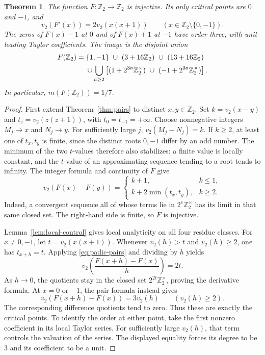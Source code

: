 \documentclass[11pt]{article}
\newtheorem{theorem}{Theorem}
\theoremstyle{remark}\newtheorem{remark}[theorem]{Remark}
\newcommand{\Ztwo}{\mathbb Z_2}\newcommand{\Qtwo}{\mathbb Q_2}
\begin{document}
\begin{theorem}\label{thm:image}
The function $F:\Ztwo\longrightarrow\Ztwo$ is injective. Its only
critical points are $0$ and $-1$, and
\[
 v_2(F'(x))=2v_2(x(x+1))\qquad(x\in\Ztwo\setminus\{0,-1\}).
\]
The zeros of $F(x)-1$ at $0$ and of $F(x)+1$ at $-1$ have order
three, with unit leading Taylor coefficients. The image is the
disjoint union
\begin{align}
 F(\Ztwo)={}&\{1,-1\}\ \cup\ (3+16\Ztwo)\ \cup\ (13+16\Ztwo)
 \notag\\
 &{}\cup\bigcup_{a\ge2}
 \left[(1+2^{3a}\Ztwo^\times)\ \cup\
       (-1+2^{3a}\Ztwo^\times)\right].\label{eq:exact-image}
\end{align}
In particular, $m(F(\Ztwo))=1/7$.
\end{theorem}
\begin{proof}
First extend Theorem~\ref{thm:pairs} to distinct $x,y\in\Ztwo$.
Set $k=v_2(x-y)$ and $t_z=v_2(z(z+1))$, with
$t_0=t_{-1}=+\infty$. Choose nonnegative integers $M_j\to x$ and
$N_j\to y$. For sufficiently large $j$, $v_2(M_j-N_j)=k$. If
$k\ge2$, at least one of $t_x,t_y$ is finite, since the distinct
roots $0,-1$ differ by an odd number. The minimum of the two
$t$-values therefore also stabilizes: a finite value is locally
constant, and the $t$-value of an approximating sequence tending to
a root tends to infinity. The integer formula and continuity of $F$
give
\begin{equation}\label{eq:padic-pairs}
 v_2(F(x)-F(y))=
 \begin{cases}
 k+1,& k\le1,\\
 k+2\min(t_x,t_y),& k\ge2.
 \end{cases}
\end{equation}
Indeed, a convergent sequence all of whose terms lie in
$2^e\Ztwo^\times$ has its limit in that same closed set. The
right-hand side is finite, so $F$ is injective.

Lemma~\ref{lem:local-control} gives local analyticity on all four
residue classes. For $x\ne0,-1$, let $t=v_2(x(x+1))$. Whenever
$v_2(h)>t$ and $v_2(h)\ge2$, one has $t_{x+h}=t$. Applying
\eqref{eq:padic-pairs} and dividing by $h$ yields
\[
 v_2\left(\frac{F(x+h)-F(x)}{h}\right)=2t.
\]
As $h\to0$, the quotients stay in the closed set
$2^{2t}\Ztwo^\times$, proving the derivative formula. At $x=0$ or
$-1$, the pair formula instead gives
\[
 v_2(F(x+h)-F(x))=3v_2(h)\qquad(v_2(h)\ge2).
\]
The corresponding difference quotients tend to zero. Thus these are
exactly the critical points. To identify the order at either point,
take the first nonzero coefficient in its local Taylor series. For
sufficiently large $v_2(h)$, that term controls the valuation of the
series. The displayed equality forces its degree to be $3$ and its
coefficient to be a unit.


\end{proof}
\end{document}

